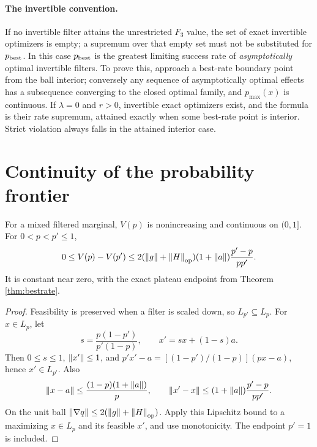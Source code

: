 \paragraph{The invertible convention.}
If no invertible filter attains the unrestricted $F_3$ value, the set of
exact invertible optimizers is empty; a supremum over that empty set must
not be substituted for $p_{\rm best}$. In this case $p_{\rm best}$ is the
greatest limiting success rate of \emph{asymptotically} optimal invertible
filters. To prove this, approach a best-rate boundary point from the ball
interior; conversely any sequence of asymptotically optimal effects has
a subsequence converging to the closed optimal family, and
$p_{\max}(x)$ is continuous. If $\lambda=0$ and $r>0$, invertible exact
optimizers exist, and the formula is their rate supremum, attained
exactly when some best-rate point is interior. Strict violation always
falls in the attained interior case.

\section{Continuity of the probability frontier}

\begin{proposition}\label{prop:ratecontinuity}
For a mixed filtered marginal, $V(p)$ is nonincreasing and continuous on
$(0,1]$. For $0<p<p'\leq1$,
\begin{equation}\label{eq:ratemodulus}
 0\leq V(p)-V(p')\leq
 2(\left\lVert g\right\rVert+\left\lVert H\right\rVert_{\rm op})(1+\left\lVert a\right\rVert)\frac{p'-p}{pp'}.
\end{equation}
It is constant near zero, with the exact plateau endpoint from
Theorem \ref{thm:bestrate}.
\end{proposition}
\begin{proof}
Feasibility is preserved when a filter is scaled down, so $L_{p'}\subseteq L_p$.
For $x\in L_p$, let
\[
 s=\frac{p(1-p')}{p'(1-p)},\qquad x'=sx+(1-s)a.
\]
Then $0\leq s\leq1$, $\left\lVert x'\right\rVert\leq1$, and
$p'x'-a=[(1-p')/(1-p)](px-a)$, hence $x'\in L_{p'}$.
Also
\[
 \left\lVert x-a\right\rVert\leq\frac{(1-p)(1+\left\lVert a\right\rVert)}p,
 \qquad\left\lVert x'-x\right\rVert\leq(1+\left\lVert a\right\rVert)\frac{p'-p}{pp'}.
\]
On the unit ball $\left\lVert\nabla q\right\rVert\leq2(\left\lVert g\right\rVert+\left\lVert H\right\rVert_{\rm op})$.
Apply this Lipschitz bound to a maximizing $x\in L_p$ and its feasible
$x'$, and use monotonicity. The endpoint $p'=1$ is included.
\end{proof}

